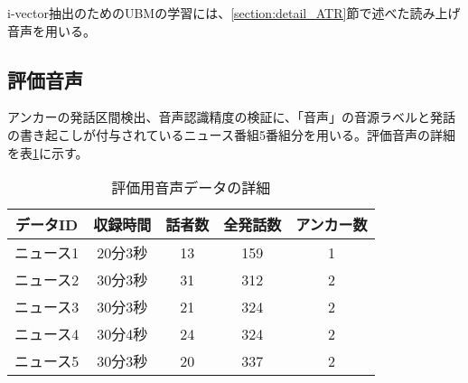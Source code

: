 \vspace{0.2in}\par
i-vector抽出のためのUBMの学習には、\ref{section:detail_ATR}節で述べた読み上げ音声を用いる。

\subsection{評価音声}
アンカーの発話区間検出、音声認識精度の検証に、「音声」の音源ラベルと発話の書き起こしが付与されているニュース番組5番組分を用いる。評価音声の詳細を表\ref{table:test_detail}に示す。

\begin{table}[H]
  \begin{center}
    \caption{評価用音声データの詳細 \label{table:test_detail}}
    \begin{tabular}{|c||c|c|c|c|} \hline
      データID & 収録時間 & 話者数 & 全発話数 & アンカー数\\ \hline
      ニュース1 & 20分3秒 & 13 & 159 & 1\\ \hline
      ニュース2 & 30分3秒 & 31 & 312 & 2\\ \hline
      ニュース3 & 30分3秒 & 21 & 324 & 2 \\ \hline
      ニュース4 & 30分4秒 & 24 & 324 & 2 \\ \hline
      ニュース5 & 30分3秒 & 20 & 337 & 2\\ \hline
    \end{tabular}
  \end{center}
\end{table}



